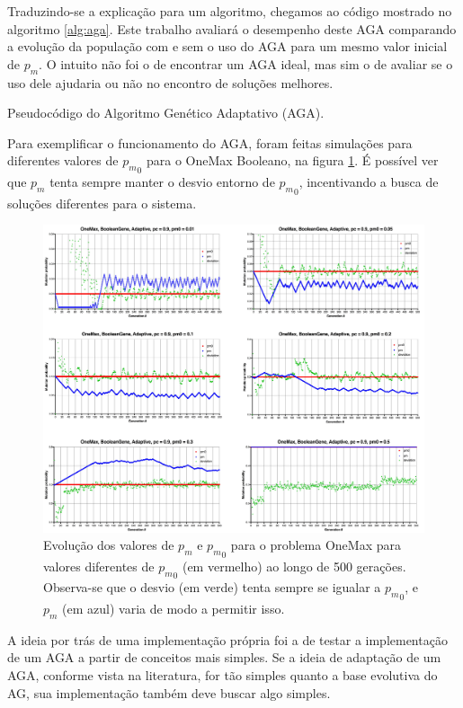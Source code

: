 Traduzindo-se a explicação para um algoritmo, chegamos ao código mostrado no algoritmo \ref{alg:aga}. Este trabalho avaliará o desempenho deste AGA comparando a evolução da população com e sem o uso do AGA para um mesmo valor inicial de $p_m$. O intuito não foi o de encontrar um AGA ideal, mas sim o de avaliar se o uso dele ajudaria ou não no encontro de soluções melhores.

\begin{algorithm}[ht]
\caption{Pseudocódigo do Algoritmo Genético Adaptativo (AGA).}
\label{alg:aga}
\end{algorithm}

Para exemplificar o funcionamento do AGA, foram feitas simulações para diferentes valores de ${p_m}_0$ para o OneMax Booleano, na figura \ref{fig:aga_test}. É possível ver que $p_m$ tenta sempre manter o desvio entorno de ${p_m}_0$, incentivando a busca de soluções diferentes para o sistema.

\begin{figure}[ht!]
    \centering \includegraphics[width=1.0\textwidth]{boolean_onemax_aga.jpg}
    \caption{Evolução dos valores de $p_m$ e ${p_m}_0$ para o problema OneMax para valores diferentes de ${p_m}_0$ (em vermelho) ao longo de 500 gerações. Observa-se que o desvio (em verde) tenta sempre se igualar a ${p_m}_0$, e $p_m$ (em azul) varia de modo a permitir isso.}
    \label{fig:aga_test}
\end{figure}

A ideia por trás de uma implementação própria foi a de testar a implementação de um AGA a partir de conceitos mais simples. Se a ideia de adaptação de um AGA, conforme vista na literatura, for tão simples quanto a base evolutiva do AG, sua implementação também deve buscar algo simples.

